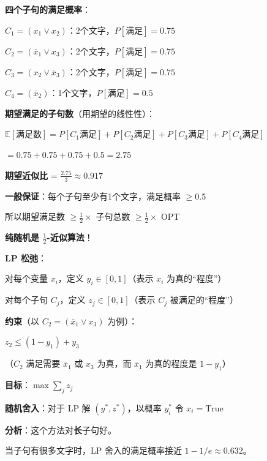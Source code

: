 \documentclass[12pt, a4paper]{ctexart}
\begin{document}
\begin{blackboard}[计算我们例子的期望]

\textbf{四个子句的满足概率}：

$C_1 = (x_1 \vee x_2)$：2个文字，$P[\text{满足}] = 0.75$

$C_2 = (\bar{x}_1 \vee x_3)$：2个文字，$P[\text{满足}] = 0.75$

$C_3 = (x_2 \vee \bar{x}_3)$：2个文字，$P[\text{满足}] = 0.75$

$C_4 = (\bar{x}_2)$：1个文字，$P[\text{满足}] = 0.5$

\textbf{期望满足的子句数}（用期望的线性性）：

$\mathbb{E}[\text{满足数}] = P[C_1\text{满足}] + P[C_2\text{满足}] + P[C_3\text{满足}] + P[C_4\text{满足}]$

$= 0.75 + 0.75 + 0.75 + 0.5 = \mathbf{2.75}$

\textbf{期望近似比} = $\frac{2.75}{3} \approx 0.917$

\textbf{一般保证}：每个子句至少有1个文字，满足概率 $\geq 0.5$

所以期望满足数 $\geq \frac{1}{2} \times$ 子句总数 $\geq \frac{1}{2} \times$ OPT

\textbf{纯随机是 $\frac{1}{2}$-近似算法}！

\end{blackboard}

\begin{blackboard}[方法2：LP 随机舍入]

\textbf{LP 松弛}：

对每个变量 $x_i$，定义 $y_i \in [0, 1]$（表示 $x_i$ 为真的``程度''）

对每个子句 $C_j$，定义 $z_j \in [0, 1]$（表示 $C_j$ 被满足的``程度''）

\textbf{约束}（以 $C_2 = (\bar{x}_1 \vee x_3)$ 为例）：

$z_2 \leq (1 - y_1) + y_3$

（$C_2$ 满足需要 $\bar{x}_1$ 或 $x_3$ 为真，而 $\bar{x}_1$ 为真的程度是 $1 - y_1$）

\textbf{目标}：$\max \sum_j z_j$

\textbf{随机舍入}：对于 LP 解 $(y^*, z^*)$，以概率 $y_i^*$ 令 $x_i = \text{True}$

\textbf{分析}：这个方法对\textbf{长}子句好。

当子句有很多文字时，LP 舍入的满足概率接近 $1 - 1/e \approx 0.632$。

\end{blackboard}
\end{document}
